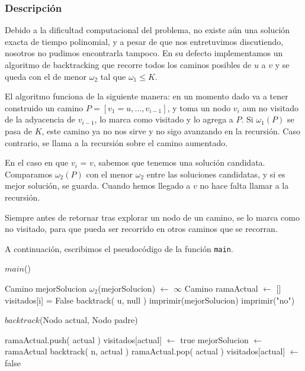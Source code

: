 \subsubsection{Descripción}

Debido a la dificultad computacional del problema, no existe a\'un una soluci\'on exacta de tiempo polinomial, y a pesar de que nos entretuvimos
discutiendo, nosotros no pudimos encontrarla tampoco. En su defecto implementamos un algoritmo de backtracking que recorre todos los caminos
posibles de $u$ a $v$ y se queda con el de menor $\omega_2$ tal que $\omega_1 \leq K$. 

El algoritmo funciona de la siguiente manera: en un momento dado va a tener construido un camino $P = [v_1 = u, \dots, v_{i-1}]$, y toma un nodo
$v_i$ aun no visitado de la adyacencia de $v_{i-1}$, lo marca como visitado y lo agrega a $P$. Si $\omega_1(P)$ se pasa de $K$, este camino ya no
nos sirve y no sigo avanzando en la recursión. Caso contrario, se llama a la recursión sobre el camino aumentado.

En el caso en que $v_i$ = $v$, sabemos que tenemos una solución candidata. Comparamos $\omega_2(P)$ con el menor $\omega_2$ entre las soluciones
candidatas, y si es mejor solución, se guarda. Cuando hemos llegado a $v$ no hace falta llamar a la recursión.

Siempre antes de retornar tras explorar un nodo de un camino, se lo marca como no visitado, para que pueda ser recorrido en otros caminos que se
recorran.

A continuaci\'on, escribimos el pseudoc\'odigo de la funci\'on \texttt{main}.
\begin{algorithm}[H]
\caption{$main$()}
\begin{algorithmic}[1]
  \State Camino mejorSolucion
  \State $\omega_2$(mejorSolucion) $\leftarrow$ $\infty$
  \State Camino ramaActual $\leftarrow$ []
    \State visitados[i] = False
  \EndFor
  \State backtrack( u, null )
    \State imprimir(mejorSolucion)
  \Else{}
    \State imprimir("no")
  \EndIf
\end{algorithmic}
\end{algorithm}

\begin{algorithm}[H]
\caption{$backtrack$(Nodo actual, Nodo padre)}
\begin{algorithmic}[1]
  \State ramaActual.push( actual )
  \State visitados[actual] $\leftarrow$ true
      \State mejorSolucion $\leftarrow$ ramaActual
	  \State backtrack( n, actual )
	\EndIf
      \EndFor
    \EndIf
  \EndIf
  \State ramaActual.pop( actual )
  \State visitados[actual] $\leftarrow$ false
\end{algorithmic}
\end{algorithm}

